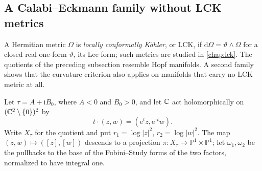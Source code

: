 \subsection{A Calabi--Eckmann family without LCK metrics}
\label{sec:calabi-eckmann-endpoints}

A Hermitian metric $\Omega$ is \emph{locally conformally K\"ahler}, or LCK, if $\mathrm d\Omega=\vartheta\wedge\Omega$ for a closed real one-form $\vartheta$, its Lee form; such metrics are studied in \cref{chap:lck}. The quotients of the preceding subsection resemble Hopf manifolds. A second family shows that the curvature criterion also applies on manifolds that carry no LCK metric at all.

Let $\tau=A+\mathrm iB_0$, where $A<0$ and $B_0>0$, and let $\mathbb C$ act holomorphically on $(\mathbb C^2\setminus\{0\})^2$ by
\[
 t\cdot(z,w)=(\mathrm e^t z,\mathrm e^{\tau t}w).
\]
Write $X_\tau$ for the quotient and put $r_1=\log|z|^2$, $r_2=\log|w|^2$. The map $(z,w)\mapsto([z],[w])$ descends to a projection $\pi\colon X_\tau\to\mathbb P^1\times\mathbb P^1$; let $\omega_1,\omega_2$ be the pullbacks to the base of the Fubini--Study forms of the two factors, normalized to have integral one.

